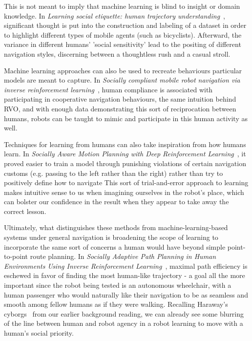 \documentclass{sfuthesis}
\begin{document}
This is not meant to imply that machine learning is blind to insight or domain knowledge. In \textit{Learning social etiquette: human trajectory understanding}~\cite{robicquet2016learning}, significant thought is put into the construction and labeling of a dataset in order to highlight different types of mobile agents (such as bicyclists). Afterward, the variance in different humans' 'social sensitivity' lead to the positing of different navigation styles, discerning between a thoughtless rush and a casual stroll.

Machine learning approaches can also be used to recreate behaviours particular models are meant to capture. In \textit{Socially compliant mobile robot navigation via inverse reinforcement learning}~\cite{kretzschmar2016socially}, human compliance is associated with participating in cooperative navigation behaviours, the same intuition behind RVO, and with enough data demonstrating this sort of reciprocation between humans, robots can be taught to mimic and participate in this human activity as well.

Techniques for learning from humans can also take inspiration from how humans learn. In \textit{Socially Aware Motion Planning with Deep Reinforcement Learning}~\cite{chen2017socially}, it proved easier to train a model through punishing violations of certain navigation customs (e.g. passing to the left rather than the right) rather than try to positively define how to navigate This sort of trial-and-error approach to learning makes intuitive sense to us when imagining ourselves in the robot's place, which can bolster our confidence in the result when they appear to take away the correct lesson.

Ultimately, what distinguishes these methods from machine-learning-based systems under general navigation is broadening the scope of learning to incorporate the same sort of concerns a human would have beyond simple point-to-point route planning. In \textit{Socially Adaptive Path Planning in Human Environments Using Inverse Reinforcement Learning}~\cite{kim2016socially}, maximal path efficiency is eschewed in favor of finding the most human-like trajectory - a goal all the more important since the robot being tested is an autonomous wheelchair, with a human passenger who would naturally like their navigation to be as seamless and smooth among fellow humans as if they were walking. Recalling Haraway's cyborgs~\cite{haraway1991cyborg} from our earlier background reading, we can already see some blurring of the line between human and robot agency in a robot learning to move with a human's social priority.
\end{document}
